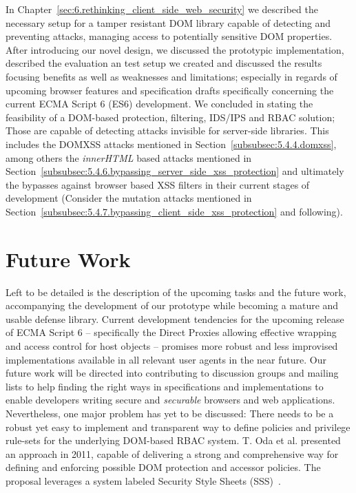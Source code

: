 In Chapter~\ref{sec:6.rethinking_client_side_web_security} we described the necessary setup for a tamper resistant DOM library capable of detecting and preventing attacks, managing access to potentially sensitive DOM properties. After introducing our novel design, we discussed the prototypic implementation, described the evaluation an test setup we created and discussed the results focusing benefits as well as weaknesses and limitations; especially in regards of upcoming browser features and specification drafts specifically concerning the current ECMA Script 6 (ES6) development. We concluded in stating the feasibility of a DOM-based protection, filtering, IDS/IPS and RBAC solution; Those are capable of detecting attacks invisible for server-side libraries. This includes the DOMXSS attacks mentioned in Section~\ref{subsubsec:5.4.4.domxss}, among others the \textit{innerHTML} based attacks mentioned in Section~\ref{subsubsec:5.4.6.bypassing_server_side_xss_protection} and ultimately the bypasses against browser based XSS filters in their current stages of development (Consider the mutation attacks mentioned in Section~\ref{subsubsec:5.4.7.bypassing_client_side_xss_protection} and following). \\

\section{Future Work}
\label{sec:future_work}

Left to be detailed is the description of the upcoming tasks and the future work, accompanying the development of our prototype while becoming a mature and usable defense library. Current development tendencies for the upcoming release of ECMA Script 6 -- specifically the Direct Proxies allowing effective wrapping and access control for host objects -- promises more robust and less improvised implementations available in all relevant user agents in the near future. Our future work will be directed into contributing to discussion groups and mailing lists to help finding the right ways in specifications and implementations to enable developers writing secure and \textit{securable} browsers and web applications. Nevertheless, one major problem has yet to be discussed: There needs to be a robust yet easy to implement and transparent way to define policies and privilege rule-sets for the underlying DOM-based RBAC system. T. Oda et al. presented an approach in 2011, capable of delivering a strong and comprehensive way for defining and enforcing possible DOM protection and accessor policies. The proposal leverages a system labeled Security Style Sheets (SSS)~\cite{oda2011securitystylesheets}.\\ 

